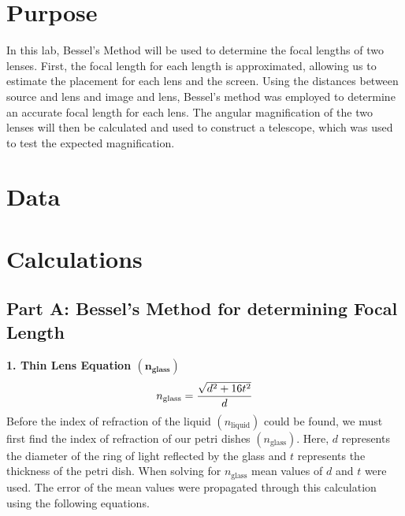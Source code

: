 \documentclass[12pt]{article}
\begin{document}

\newpage
\tableofcontents
\newpage
\section{Purpose}
In this lab, Bessel's Method will be used to determine the focal lengths of two lenses. 
First, the focal length for each length is approximated, allowing us to estimate the placement for each lens and the screen. 
Using the distances between source and lens and image and lens, Bessel's method was employed to determine an accurate focal length for each lens. 
The angular magnification of the two lenses will then be calculated and used to construct a telescope, which was used to test the expected magnification. 
\newpage
\section{Data}

\newpage
\section{Calculations}
\subsection*{Part A: Bessel's Method for determining Focal Length}
\noindent \textbf{1. Thin Lens Equation $\bm{({n_{\textbf{glass}}})}$}\[n_{\textnormal{glass}}=\frac{\sqrt{d^2+16t^2}}{d}\]
    Before the index of refraction of the liquid $(n_\text{liquid})$ could be found, we must first find the index of refraction of our petri dishes $(n_\text{glass})$. Here, $d$ represents the diameter of the ring of light reflected by the glass and $t$ represents the thickness of the petri dish. When solving for $n_\text{glass}$ mean values of $d$ and $t$ were used. The error of the mean values were propagated through this calculation using the following equations. 
\end{document}
